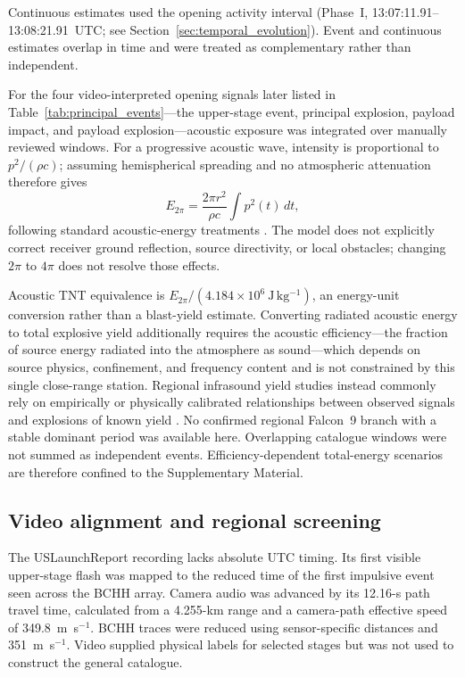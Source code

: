 \documentclass[]{seismica}
\begin{document}
Continuous estimates used the opening activity interval
(Phase~I, 13:07:11.91--13:08:21.91~UTC; see
Section~\ref{sec:temporal_evolution}). Event and continuous estimates overlap
in time and were treated as complementary rather than independent.


For the four video-interpreted opening signals later listed in
Table~\ref{tab:principal_events}---the upper-stage event, principal explosion,
payload impact, and payload explosion---acoustic exposure
was integrated over manually reviewed windows. For a progressive acoustic wave,
intensity is proportional to $p^2/(\rho c)$; assuming hemispherical spreading
and no atmospheric attenuation therefore gives
\begin{equation}
 E_{2\pi}=\frac{2\pi r^2}{\rho c}\int p^2(t)\,dt,
 \label{eq:acoustic_energy}
\end{equation}
following standard acoustic-energy treatments
\citep[e.g.,][]{johnson_aster_2005}.
The model does not explicitly correct receiver ground reflection, source
directivity, or local obstacles; changing $2\pi$ to $4\pi$ does not resolve
those effects.

Acoustic TNT equivalence is
$E_{2\pi}/(4.184\times10^6~\mathrm{J\,kg^{-1}})$,
an energy-unit conversion rather than a blast-yield estimate.
Converting radiated acoustic energy to total explosive yield additionally
requires the acoustic efficiency---the fraction of source energy radiated into
the atmosphere as sound---which depends on source physics, confinement, and
frequency content and is not constrained by this single close-range station.
Regional infrasound yield studies instead commonly rely on empirically or
physically calibrated relationships between observed signals and explosions of
known yield
\citep[e.g.,][]{ottemoller_2008,ceranna_2009,pilger_beirut_2021,kim_pasyanos_2022,
silber_scamfer_newglenn_2026}.
No confirmed regional Falcon~9 branch with a stable dominant period was
available here. Overlapping catalogue windows were not summed as independent
events. Efficiency-dependent total-energy scenarios are therefore confined to
the Supplementary Material.

\subsection{Video alignment and regional screening}

The USLaunchReport recording lacks absolute UTC timing. Its first visible upper-stage
flash was mapped to the reduced time of the first impulsive event seen across the BCHH array. Camera audio
was advanced by its 12.16-s path travel time, calculated from a 4.255-km range
and a camera-path effective speed of 349.8~m~s$^{-1}$. BCHH traces were reduced
using sensor-specific distances and 351~m~s$^{-1}$. Video supplied physical
labels for selected stages but was not used to construct the general catalogue.
\end{document}
